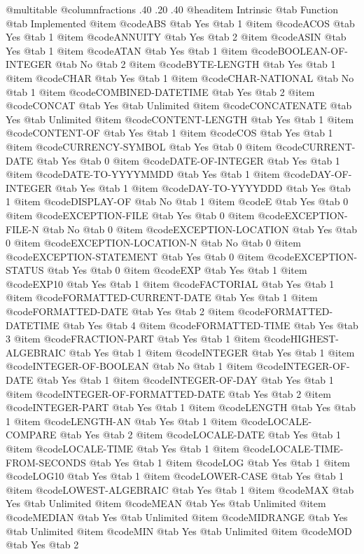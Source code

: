 @multitable @columnfractions .40 .20 .40
@headitem Intrinsic
@tab Function @tab Implemented
@item @code{ABS}
@tab Yes @tab 1
@item @code{ACOS}
@tab Yes @tab 1
@item @code{ANNUITY}
@tab Yes @tab 2
@item @code{ASIN}
@tab Yes @tab 1
@item @code{ATAN}
@tab Yes @tab 1
@item @code{BOOLEAN-OF-INTEGER}
@tab No @tab 2
@item @code{BYTE-LENGTH}
@tab Yes @tab 1
@item @code{CHAR}
@tab Yes @tab 1
@item @code{CHAR-NATIONAL}
@tab No @tab 1
@item @code{COMBINED-DATETIME}
@tab Yes @tab 2
@item @code{CONCAT}
@tab Yes @tab Unlimited
@item @code{CONCATENATE}
@tab Yes @tab Unlimited
@item @code{CONTENT-LENGTH}
@tab Yes @tab 1
@item @code{CONTENT-OF}
@tab Yes @tab 1
@item @code{COS}
@tab Yes @tab 1
@item @code{CURRENCY-SYMBOL}
@tab Yes @tab 0
@item @code{CURRENT-DATE}
@tab Yes @tab 0
@item @code{DATE-OF-INTEGER}
@tab Yes @tab 1
@item @code{DATE-TO-YYYYMMDD}
@tab Yes @tab 1
@item @code{DAY-OF-INTEGER}
@tab Yes @tab 1
@item @code{DAY-TO-YYYYDDD}
@tab Yes @tab 1
@item @code{DISPLAY-OF}
@tab No @tab 1
@item @code{E}
@tab Yes @tab 0
@item @code{EXCEPTION-FILE}
@tab Yes @tab 0
@item @code{EXCEPTION-FILE-N}
@tab No @tab 0
@item @code{EXCEPTION-LOCATION}
@tab Yes @tab 0
@item @code{EXCEPTION-LOCATION-N}
@tab No @tab 0
@item @code{EXCEPTION-STATEMENT}
@tab Yes @tab 0
@item @code{EXCEPTION-STATUS}
@tab Yes @tab 0
@item @code{EXP}
@tab Yes @tab 1
@item @code{EXP10}
@tab Yes @tab 1
@item @code{FACTORIAL}
@tab Yes @tab 1
@item @code{FORMATTED-CURRENT-DATE}
@tab Yes @tab 1
@item @code{FORMATTED-DATE}
@tab Yes @tab 2
@item @code{FORMATTED-DATETIME}
@tab Yes @tab 4
@item @code{FORMATTED-TIME}
@tab Yes @tab 3
@item @code{FRACTION-PART}
@tab Yes @tab 1
@item @code{HIGHEST-ALGEBRAIC}
@tab Yes @tab 1
@item @code{INTEGER}
@tab Yes @tab 1
@item @code{INTEGER-OF-BOOLEAN}
@tab No @tab 1
@item @code{INTEGER-OF-DATE}
@tab Yes @tab 1
@item @code{INTEGER-OF-DAY}
@tab Yes @tab 1
@item @code{INTEGER-OF-FORMATTED-DATE}
@tab Yes @tab 2
@item @code{INTEGER-PART}
@tab Yes @tab 1
@item @code{LENGTH}
@tab Yes @tab 1
@item @code{LENGTH-AN}
@tab Yes @tab 1
@item @code{LOCALE-COMPARE}
@tab Yes @tab 2
@item @code{LOCALE-DATE}
@tab Yes @tab 1
@item @code{LOCALE-TIME}
@tab Yes @tab 1
@item @code{LOCALE-TIME-FROM-SECONDS}
@tab Yes @tab 1
@item @code{LOG}
@tab Yes @tab 1
@item @code{LOG10}
@tab Yes @tab 1
@item @code{LOWER-CASE}
@tab Yes @tab 1
@item @code{LOWEST-ALGEBRAIC}
@tab Yes @tab 1
@item @code{MAX}
@tab Yes @tab Unlimited
@item @code{MEAN}
@tab Yes @tab Unlimited
@item @code{MEDIAN}
@tab Yes @tab Unlimited
@item @code{MIDRANGE}
@tab Yes @tab Unlimited
@item @code{MIN}
@tab Yes @tab Unlimited
@item @code{MOD}
@tab Yes @tab 2
